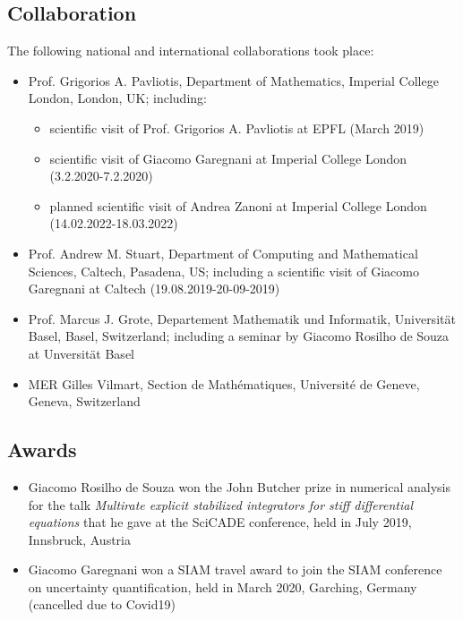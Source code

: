 \documentclass[10pt]{article}
\begin{document}
\subsection{Collaboration}

The following national and international collaborations took place:
\begin{itemize}
	\item Prof. Grigorios A. Pavliotis, Department of Mathematics, Imperial College London, London, UK; including: 
	\begin{itemize}
		\item scientific visit of Prof. Grigorios A. Pavliotis at EPFL (March 2019)
		\item scientific visit of Giacomo Garegnani at Imperial College London (3.2.2020-7.2.2020)
		\item planned scientific visit of Andrea Zanoni at Imperial College London (14.02.2022-18.03.2022)
	\end{itemize}
	\item Prof. Andrew M. Stuart, Department of Computing and Mathematical Sciences, Caltech, Pasadena, US; including a scientific visit of Giacomo Garegnani at Caltech (19.08.2019-20-09-2019)
	\item Prof. Marcus J. Grote, Departement Mathematik und Informatik, Universität Basel, Basel, Switzerland; including a seminar by Giacomo Rosilho de Souza at Unversität Basel
	\item MER Gilles Vilmart, Section de Mathématiques, Université de Geneve, Geneva, Switzerland
\end{itemize}

\subsection{Awards}

\begin{itemize}
	\item Giacomo Rosilho de Souza won the John Butcher prize in numerical analysis for the talk \textit{Multirate explicit stabilized integrators for stiff differential equations} that he gave at the SciCADE conference, held in July 2019, Innsbruck, Austria
	\item Giacomo Garegnani won a SIAM travel award to join the SIAM conference on uncertainty quantification, held in March 2020, Garching, Germany (cancelled due to Covid19) 
\end{itemize}
\end{document}
